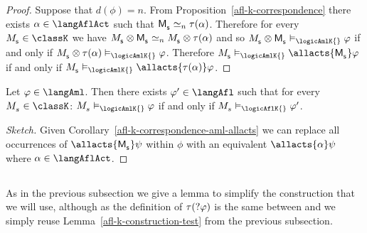 \begin{proof}
Suppose that $d(\phi) = n$.
From Proposition~\ref{afl-k-correspondence} there exists $\alpha \in \langAflAct$ such that $\aPModel{\aStateS} \bisimilar[n] \tau(\alpha)$.
Therefore for every $\kPModel{\aStateS} \in \classK$ we have $\kPModel{\aStateS} \exec \aPModel{\aStateS} \bisimilar[n] \kPModel{\aStateS} \exec \tau(\alpha)$ and so $\kPModel{\aStateS} \exec \aPModel{\aStateS} \entails_\logicAmlK{} \phi$ if and only if $\kPModel{\aStateS} \exec \tau(\alpha) \entails_\logicAmlK{} \phi$.
Therefore $\kPModel{\aStateS} \entails_\logicAmlK{} \allacts{\aPModel{\aStateS}}  \phi$ if and only if $\kPModel{\aStateS} \entails_\logicAmlK{} \allacts{\tau(\alpha)}  \phi$.
\end{proof}

\begin{corollary}\label{afl-k-correspondence-afl-aml}
Let $\phi \in \langAml$. 
Then there exists $\phi' \in \langAfl$ such that for every $\kPModel{\kStateS} \in \classK$: $\kPModel{\kStateS} \entails_\logicAmlK{} \phi$ if and only if $\kPModel{\kStateS} \entails_\logicAflK{} \phi'$.
\end{corollary}

\begin{proof}[Sketch]
Given Corollary~\ref{afl-k-correspondence-aml-allacts} we can replace all occurrences of $\allacts{\aPModel{\aStateS}} \psi$ within $\phi$ with an equivalent $\allacts{\alpha} \psi$ where $\alpha \in \langAflAct$.
\end{proof}

\subsection{\classKFF{}}

As in the previous subsection we give a lemma to simplify the construction that we will use, although as the definition of $\tau(?{\varphi})$ is the same between \classK{} and \classKFF{} we simply reuse Lemma~\ref{afl-k-construction-test} from the previous subsection.

